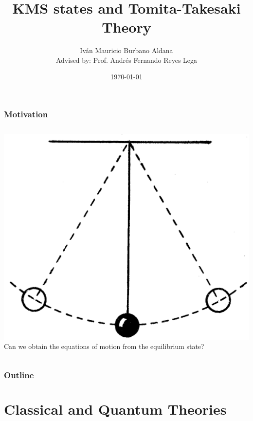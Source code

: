 \documentclass{beamer}
\title{KMS states and Tomita-Takesaki Theory}
\author[Iván Burbano]{Iván Mauricio Burbano Aldana\\[1cm]{\small Advised by: Prof. Andrés Fernando Reyes Lega}}
\institute{Universidad de los Andes}
\date{\today}
\begin{document}
\begin{frame}
	\titlepage
\end{frame}

\begin{frame}
	\frametitle{Motivation}
	\begin{columns}
		\includegraphics[width=\textwidth]{images/pendulum.png}
		Can we obtain the equations of motion from the equilibrium state?
		\vspace{1cm}
		
	\end{columns}
\end{frame}

\begin{frame}
	\frametitle{Outline}
	\tableofcontents
\end{frame}

\section{Classical and Quantum Theories}
\end{document}
